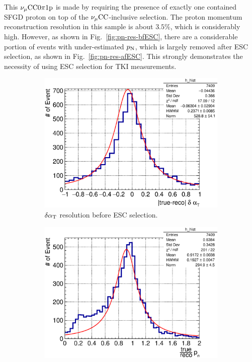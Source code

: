         This $\nu_{\mu}\textrm{CC}0\pi1\textrm{p}$ is made by requiring the presence of exactly one contained SFGD proton on top of the $\nu_{\mu}\textrm{CC}$-inclusive selection. 
        The proton momentum reconstruction resolution in this sample is about $3.5\%$, which is considerably high. 
        However, as shown in Fig.~\ref{fig:pn-res-bfESC}, there are a considerable portion of events with under-estimated $p_\textrm{N}$, which is largely removed after ESC selection, as shown in Fig.~\ref{fig:pn-res-afESC}.
        This strongly demonstrates the necessity of using ESC selection for TKI measurements.

        \begin{figure}[!htb] 
           \centering
           \begin{subfigure}{0.45\textwidth}
                \includegraphics[width=\textwidth]{figures/dalphat_rat_hist_al13.eps}
                \caption{$\delta\alpha_\textrm{T}$ resolution before ESC selection.}
                \label{fig:dat-res-bfESC}
           \end{subfigure}
           \begin{subfigure}{0.45\textwidth}
                \includegraphics[width=\textwidth]{figures/pn_rat_hist_al13.eps}

\end{subfigure}
\end{figure}
